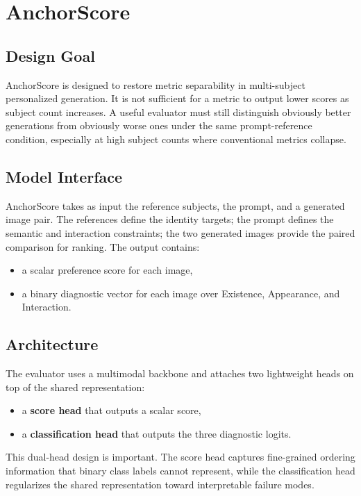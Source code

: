 \section{AnchorScore}

\subsection{Design Goal}
AnchorScore is designed to restore metric separability in multi-subject personalized generation. It is not sufficient for a metric to output lower scores as subject count increases. A useful evaluator must still distinguish obviously better generations from obviously worse ones under the same prompt-reference condition, especially at high subject counts where conventional metrics collapse.

\subsection{Model Interface}
AnchorScore takes as input the reference subjects, the prompt, and a generated image pair. The references define the identity targets; the prompt defines the semantic and interaction constraints; the two generated images provide the paired comparison for ranking. The output contains:
\begin{itemize}
    \item a scalar preference score for each image,
    \item a binary diagnostic vector for each image over Existence, Appearance, and Interaction.
\end{itemize}

\subsection{Architecture}
The evaluator uses a multimodal backbone and attaches two lightweight heads on top of the shared representation:
\begin{itemize}
    \item a \textbf{score head} that outputs a scalar score,
    \item a \textbf{classification head} that outputs the three diagnostic logits.
\end{itemize}

This dual-head design is important. The score head captures fine-grained ordering information that binary class labels cannot represent, while the classification head regularizes the shared representation toward interpretable failure modes.

